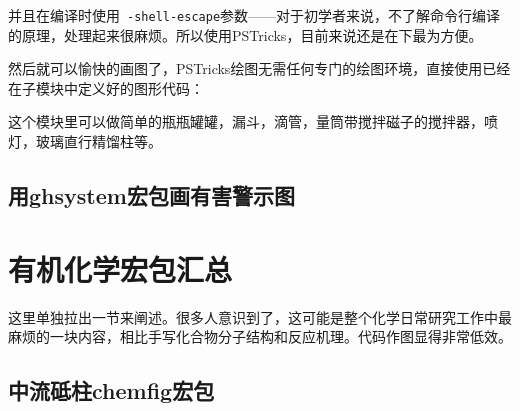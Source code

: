 \documentclass[a4paper,UTF8,zihao = -4]{ctexart} %
\begin{document}
\begin{dispListing}
\usepackage[pdf]{pstricks}
\usepackage{pst-labo}  
\end{dispListing}

\noindent 并且在编译时使用~\texttt{-shell-escape}参数——对于初学者来说，不了解命令行编译的原理，处理起来很麻烦。所以使用\textsf{PSTricks}，目前来说还是在下最为方便。

然后就可以愉快的画图了，PSTricks绘图无需任何专门的绘图环境，直接使用已经在子模块中定义好的图形代码：


这个模块里可以做简单的瓶瓶罐罐，漏斗，滴管，量筒带搅拌磁子的搅拌器，喷灯，玻璃直行精馏柱等。


\subsection{用\textsf{ghsystem}宏包画有害警示图}



\section{有机化学宏包汇总}
\label{sec:organic}

这里单独拉出一节来阐述。很多人意识到了，这可能是整个化学日常研究工作中最麻烦的一块内容，相比手写化合物分子结构和反应机理。代码作图显得非常低效。

\subsection{中流砥柱\textsf{chemfig}宏包}
\label{sec:chemfig}
\end{document}
